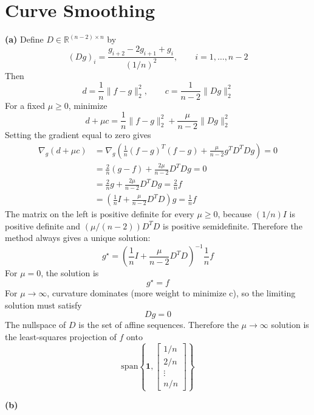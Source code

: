 \section{Curve Smoothing}

\textbf{(a)}
Define \(D\in\mathbb{R}^{(n-2)\times n}\) by
\[
(Dg)_i=\frac{g_{i+2}-2g_{i+1}+g_i}{(1/n)^2},
\qquad i=1,\ldots,n-2
\]
Then
\[
d=\frac{1}{n}\|f-g\|_2^2,
\qquad
c=\frac{1}{n-2}\|Dg\|_2^2
\]
For a fixed \(\mu\ge 0\), minimize
\[
d+\mu c
=
\frac{1}{n}\|f-g\|_2^2
+\frac{\mu}{n-2}\|Dg\|_2^2
\]
Setting the gradient equal to zero gives
\begin{align*}
    \nabla_g (d+\mu c) &=
    \nabla_g\left(\frac{1}{n}(f-g)^T(f-g)+\frac{\mu}{n-2}g^TD^TDg\right) =0 \\
    &= \frac{2}{n}(g-f)+\frac{2\mu}{n-2}D^TDg = 0 \\
    &= \frac{2}{n}g+\frac{2\mu}{n-2}D^TDg = \frac{2}{n}f \\
    &= \left(\frac{1}{n}I+\frac{\mu}{n-2}D^TD\right)g = \frac{1}{n}f
\end{align*}
The matrix on the left is positive definite for every \(\mu\ge 0\), because \((1/n)I\) is positive definite and \((\mu/(n-2))D^TD\) is positive semidefinite. Therefore the method always gives a unique solution:
\[
g^\star=
\left(\frac{1}{n}I+\frac{\mu}{n-2}D^TD\right)^{-1}
\frac{1}{n}f
\]
For \(\mu=0\), the solution is
\[
g^\star=f
\]
For \(\mu\to\infty\), curvature dominates (more weight to minimize c), so the limiting solution must satisfy
\[
Dg=0
\]
The nullspace of \(D\) is the set of affine sequences. Therefore the \(\mu\to\infty\) solution is the least-squares projection of \(f\) onto
\[
\mathrm{span}\left\{\mathbf{1},
\begin{bmatrix}
1/n\\2/n\\ \vdots\\ n/n
\end{bmatrix}
\right\}
\]

\textbf{(b)}

